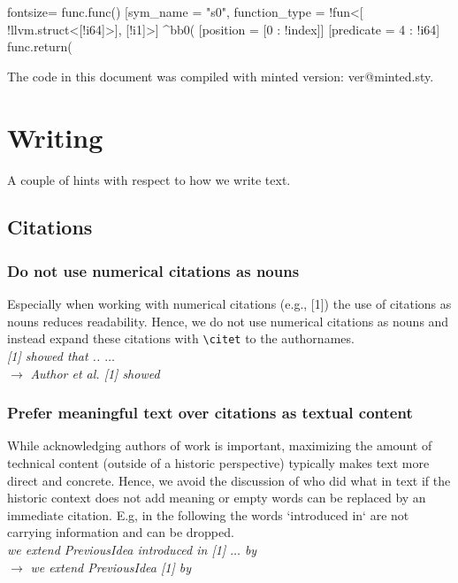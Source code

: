 \documentclass[review, anonymous, acmsmall]{acmart}
\newenvironment{draftonly}{}{}
\begin{document}
\begin{draftonly}
\begin{xdsl*}{fontsize=\scriptsize}
func.func() [sym_name = "s0", function_type = !fun<[
    !llvm.struct<[!i64]>], [!i1]>] {
  ^bb0(%
              [position = [0 : !index]]
              [predicate = 4 : !i64]
    func.return(%
}
\end{xdsl*}

The code in this document was compiled with minted version: \csname ver@minted.sty\endcsname.

\section{Writing}

A couple of hints with respect to how we write text.

\subsection{Citations}
\label{appendix:citations}

\subsubsection{Do not use numerical citations as nouns}
Especially when working with numerical citations (e.g., [1]) the use of
citations as nouns reduces readability. Hence, we do not use numerical citations
as nouns and instead expand these citations with \texttt{\textbackslash{}citet} to the
authornames.
\\
{\color{pairedTwoDarkBlue}
\textit{[1] showed that .. $\dots$}}\\
$\to$ {\color{pairedFourDarkGreen}\textit{Author et al. [1] showed}}

\subsubsection{Prefer meaningful text over citations as textual content}
While acknowledging authors of work is important, maximizing the amount of technical
content (outside of a historic perspective) typically makes text more direct and
concrete. Hence, we avoid the discussion of who did what in text if the
historic context does not add meaning or empty words can be replaced by an immediate
citation. E.g, in the following the words `introduced in` are not carrying
information and can be dropped.\\
{\color{pairedTwoDarkBlue}
\textit{we extend PreviousIdea introduced in [1] $\dots$ by}}\\
$\to$ {\color{pairedFourDarkGreen}\textit{we extend PreviousIdea [1] by}}



\end{draftonly}
\end{document}
